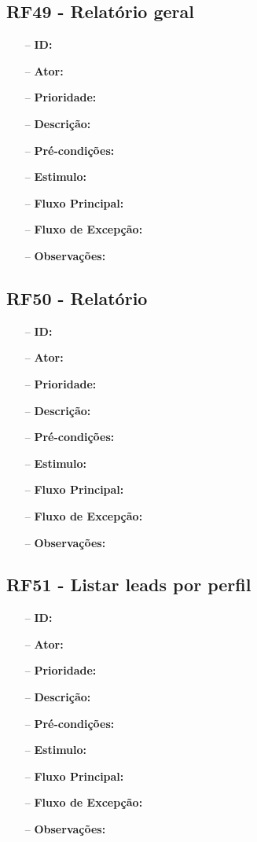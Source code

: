 \subsection{RF49 - Relatório geral}
\begin{itemize}
	\item[--] \textbf{ID:} 
	\item[--]  \textbf{Ator:} 
	\item[--]  \textbf{Prioridade:} 
	\item[--]  \textbf{Descrição:} 
	\item[--]  \textbf{Pré-condições:} 
	\item[--]  \textbf{Estimulo:}
	\item[--]  \textbf{Fluxo Principal:} 
	\subitem
	\subitem
	\subitem
	\subitem
	\item[--]  \textbf{Fluxo de Excepção:} 
	\subitem
	\subitem
	\subitem
	\subitem
	\item[--]  \textbf{Observações:}  
\end{itemize}
\newpage

\subsection{RF50 - Relatório}
\begin{itemize}
	\item[--] \textbf{ID:} 
	\item[--]  \textbf{Ator:} 
	\item[--]  \textbf{Prioridade:} 
	\item[--]  \textbf{Descrição:} 
	\item[--]  \textbf{Pré-condições:} 
	\item[--]  \textbf{Estimulo:}
	\item[--]  \textbf{Fluxo Principal:} 
	\subitem
	\subitem
	\subitem
	\subitem
	\item[--]  \textbf{Fluxo de Excepção:} 
	\subitem
	\subitem
	\subitem
	\subitem
	\item[--]  \textbf{Observações:} 
\end{itemize}
\newpage

\subsection{RF51 - Listar leads por perfil}
\begin{itemize}
	\item[--] \textbf{ID:} 
	\item[--]  \textbf{Ator:} 
	\item[--]  \textbf{Prioridade:} 
	\item[--]  \textbf{Descrição:} 
	\item[--]  \textbf{Pré-condições:} 
	\item[--]  \textbf{Estimulo:}
	\item[--]  \textbf{Fluxo Principal:} 
	\subitem
	\subitem
	\subitem
	\subitem
	\item[--]  \textbf{Fluxo de Excepção:} 
	\subitem
	\subitem
	\subitem
	\subitem
	\item[--]  \textbf{Observações:} 
\end{itemize}
\newpage

